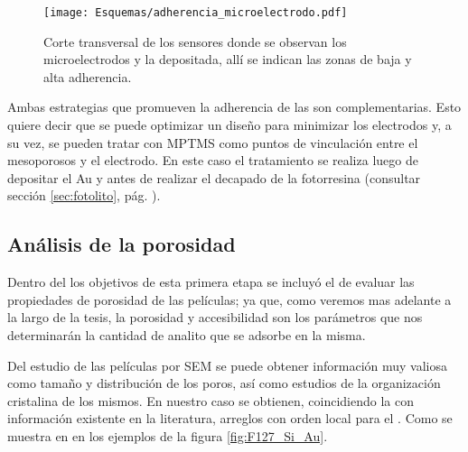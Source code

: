 				\begin{figure}[!ht]
					\begin{center}
					\texttt{[image: Esquemas/adherencia\_microelectrodo.pdf]}
					\caption[Adherencia a los microelectrodos.]{Corte transversal de los sensores donde se observan los microelectrodos y la \pdm depositada, allí se indican las zonas de baja y alta adherencia.}
					\label{fig:adherencia_microelectrodo}
					\end{center}
					\end{figure}
			Ambas estrategias que promueven la adherencia de las \pdm\space son complementarias. Esto quiere decir que se puede optimizar un diseño para minimizar los electrodos y, a su vez, se pueden tratar con MPTMS como puntos de vinculación entre el mesoporosos y el electrodo. En este caso el tratamiento se realiza luego de depositar el Au y antes de realizar el decapado de la fotorresina (consultar sección \ref{sec:fotolito}, pág. \pageref{sec:fotolito}).		

	\subsection{Análisis de la porosidad}

		Dentro del los objetivos de esta primera etapa se incluyó el de evaluar las propiedades de porosidad de las películas; ya que, como veremos mas adelante a la largo de la tesis, la porosidad y accesibilidad son los parámetros que nos determinarán la cantidad de analito que se adsorbe en la misma. 

		Del estudio de las películas por SEM se puede obtener información muy valiosa como tamaño y distribución de los poros, así como estudios de la organización cristalina de los mismos. En nuestro caso se obtienen, coincidiendo la con información existente en la literatura, arreglos con orden local para el \pdmF. Como se muestra en en los ejemplos de la figura \ref{fig:F127_Si_Au}.

